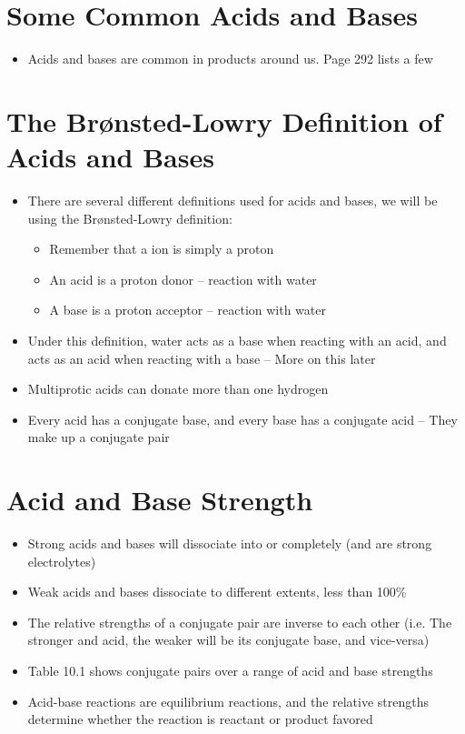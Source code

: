 \documentclass[12pt, openany, letterpaper]{memoir}
\begin{document}
\section{Some Common Acids and Bases}
\begin{itemize}
	\item Acids and bases are common in products around us. Page 292 lists a few
\end{itemize}

\section{The Br\o nsted-Lowry Definition of Acids and Bases}
\begin{itemize}
	\item There are several different definitions used for acids and bases, we will be using the Br\o nsted-Lowry definition:
	      \begin{itemize}
		      \item Remember that a  ion is simply a proton
		      \item An acid is a proton donor --  reaction with water
		      \item A base is a proton acceptor --  reaction with water
	      \end{itemize}
	\item Under this definition, water acts as a base when reacting with an acid, and acts as an acid when reacting with a base -- More on this later
	\item Multiprotic acids can donate more than one hydrogen
	\item Every acid has a conjugate base, and every base has a conjugate acid -- They make up a conjugate pair
\end{itemize}

\section{Acid and Base Strength}
\begin{itemize}
	\item Strong acids and bases will dissociate into  or  completely (and are strong electrolytes)
	\item Weak acids and bases dissociate to different extents, less than 100\%
	\item The relative strengths of a conjugate pair are inverse to each other (i.e. The stronger and acid, the weaker will be its conjugate base, and vice-versa)
	\item Table 10.1 shows conjugate pairs over a range of acid and base strengths
	\item Acid-base reactions are equilibrium reactions, and the relative strengths determine whether the reaction is reactant or product favored
\end{itemize}
\end{document}
